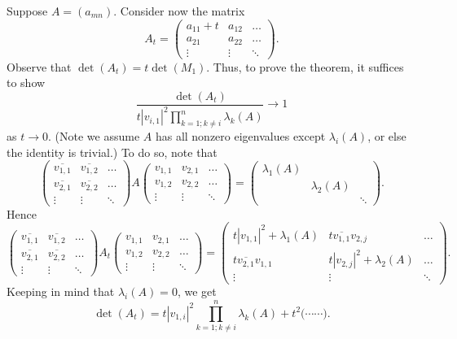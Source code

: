 \documentclass[12pt, letterpaper]{article}
\renewcommand{\l}{\lambda}
\begin{document}
Suppose $A = (a_{mn})$. Consider now the matrix
\[
    A_t = 
    \begin{pmatrix}
        a_{11} + t  & a_{12}    & \dots\\
        a_{21}      & a_{22}    & \dots\\
        \vdots      & \vdots    & \ddots
    \end{pmatrix}.
\]
Observe that $\det(A_t) = t\det(M_1)$. Thus, to prove the theorem, it suffices to show
\[
    \frac{\det(A_t)}{
    t|v_{i,1}|^2 \prod_{k = 1; k \neq i}^n \l_k(A)
    } \rightarrow 1
\]
as $t \rightarrow 0$. (Note we assume $A$ has all nonzero eigenvalues except $\l_i(A)$, or else the identity is trivial.) To do so, note that
\[
    \begin{pmatrix}
        \overline{v_{1,1}}   & \overline{v_{1,2}} & \dots\\
        \overline{v_{2,1}}   & \overline{v_{2,2}} & \dots\\
        \vdots      & \vdots    & \ddots
    \end{pmatrix}
    A
    \begin{pmatrix}
        v_{1,1} & v_{2,1} & \dots\\
        v_{1,2} & v_{2,2} & \dots\\
        \vdots      & \vdots    & \ddots
    \end{pmatrix}
    =
    \begin{pmatrix}
        \l_1(A) & & \\
        & \l_2(A) & \\
        & & \ddots
    \end{pmatrix}.
\]
Hence
\[
    \begin{pmatrix}
        \overline{v_{1,1}}   & \overline{v_{1,2}} & \dots\\
        \overline{v_{2,1}}   & \overline{v_{2,2}} & \dots\\
        \vdots      & \vdots    & \ddots
    \end{pmatrix}
    A_t
    \begin{pmatrix}
        v_{1,1} & v_{2,1} & \dots\\
        v_{1,2} & v_{2,2} & \dots\\
        \vdots      & \vdots    & \ddots
    \end{pmatrix}
    =
    \begin{pmatrix}
        t|v_{1,1}|^2 + \l_1(A)   & t\overline{v_{1,1}}v_{2,j} & \dots\\
        t\overline{v_{2,1}}v_{1,1}   & t|v_{2,j}|^2 + \l_2(A) & \dots\\
        \vdots                  & \vdots                & \ddots
    \end{pmatrix}.
\]
Keeping in mind that $\l_i(A) = 0$, we get
\[
    \det(A_t) = t|v_{1,i}|^2 \prod_{k = 1; k \neq i}^n \l_k(A)
    + t^2\Big( \cdots \cdots \Big).
\]
\end{document}
